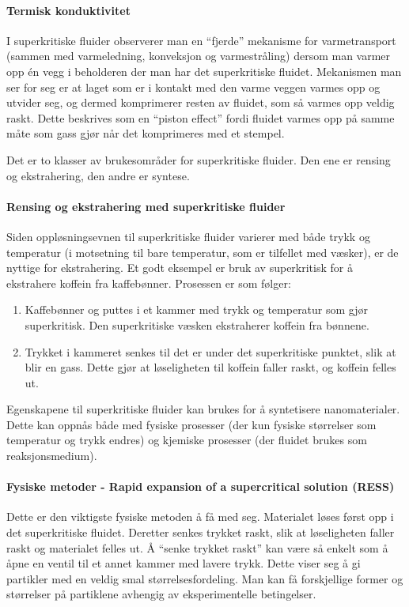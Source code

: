 \paragraph{Termisk konduktivitet} I superkritiske fluider observerer man en ``fjerde'' mekanisme for varmetransport (sammen med varmeledning, konveksjon og varmestråling) dersom man varmer opp én vegg i beholderen der man har det superkritiske fluidet. Mekanismen man ser for seg er at laget som er i kontakt med den varme veggen varmes opp og utvider seg, og dermed komprimerer resten av fluidet, som så varmes opp veldig raskt. Dette beskrives som en ``piston effect'' fordi fluidet varmes opp på samme måte som gass gjør når det komprimeres med et stempel.
\vfill
{}

Det er to klasser av brukesområder for superkritiske fluider. Den ene er rensing og ekstrahering, den andre er syntese.

\paragraph{Rensing og ekstrahering med superkritiske fluider} Siden oppløsningsevnen til superkritiske fluider varierer med både trykk og temperatur (i motsetning til bare temperatur, som er tilfellet med væsker), er de nyttige for ekstrahering. Et godt eksempel er bruk av superkritisk  for å ekstrahere koffein fra kaffebønner. Prosessen er som følger:
\begin{enumerate}
	\item Kaffebønner og  puttes i et kammer med trykk og temperatur som gjør  superkritisk. Den superkritiske væsken ekstraherer koffein fra bønnene.
	\item Trykket i kammeret senkes til det er under det superkritiske punktet, slik at  blir en gass. Dette gjør at løseligheten til koffein faller raskt, og koffein felles ut.
\end{enumerate}

Egenskapene til superkritiske fluider kan brukes for å syntetisere nanomaterialer. Dette kan oppnås både med fysiske prosesser (der kun fysiske størrelser som temperatur og trykk endres) og kjemiske prosesser (der fluidet brukes som reaksjonsmedium).

\paragraph{Fysiske metoder - Rapid expansion of a supercritical solution (RESS)} Dette er den viktigste fysiske metoden å få med seg. Materialet løses først opp i det superkritiske fluidet. Deretter senkes trykket raskt, slik at løseligheten faller raskt og materialet felles ut. Å ``senke trykket raskt'' kan være så enkelt som å åpne en ventil til et annet kammer med lavere trykk. Dette viser seg å gi partikler med en veldig smal størrelsesfordeling. Man kan få forskjellige former og størrelser på partiklene avhengig av eksperimentelle betingelser.


